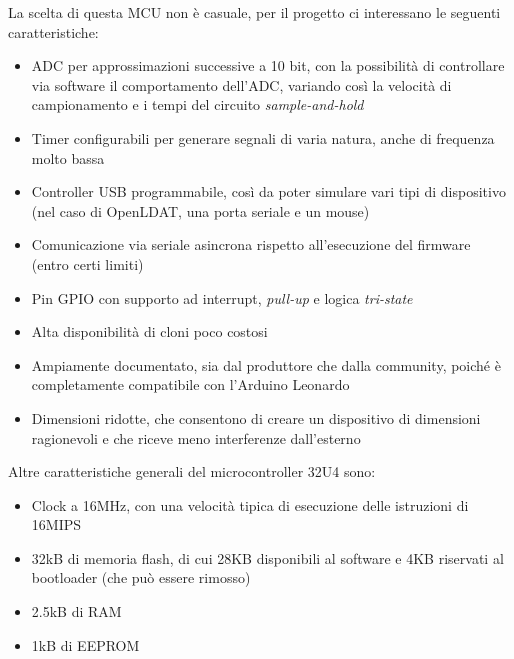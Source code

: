 La scelta di questa MCU non è casuale, per il progetto ci interessano le seguenti caratteristiche:
\begin{itemize}
	\item ADC per approssimazioni successive a 10 bit, con la possibilità di controllare via software il comportamento dell'ADC, variando così la velocità di campionamento e i tempi del circuito \textit{sample-and-hold}
	\item Timer configurabili per generare segnali di varia natura, anche di frequenza molto bassa
	\item Controller USB programmabile, così da poter simulare vari tipi di dispositivo (nel caso di OpenLDAT, una porta seriale e un mouse)
	\item Comunicazione via seriale asincrona rispetto all'esecuzione del firmware (entro certi limiti)
	\item Pin GPIO con supporto ad interrupt, \textit{pull-up} e logica \textit{tri-state}
	\item Alta disponibilità di cloni poco costosi
	\item Ampiamente documentato, sia dal produttore che dalla community, poiché è completamente compatibile con l'Arduino Leonardo
	\item Dimensioni ridotte, che consentono di creare un dispositivo di dimensioni ragionevoli e che riceve meno interferenze dall'esterno
\end{itemize}

Altre caratteristiche generali del microcontroller 32U4 sono:
\begin{itemize}
	\item Clock a 16MHz, con una velocità tipica di esecuzione delle istruzioni di 16MIPS
	\item 32kB di memoria flash, di cui 28KB disponibili al software e 4KB riservati al bootloader (che può essere rimosso)
	\item 2.5kB di RAM
	\item 1kB di EEPROM
\end{itemize}

